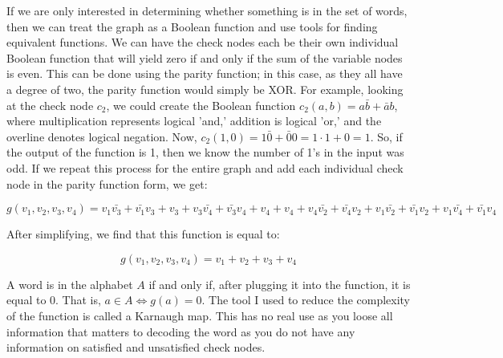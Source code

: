 \documentclass{article}
\begin{document}
If we are only interested in determining whether something is in the set of words, then we can treat the graph as a Boolean function and use tools for finding equivalent functions. We can have the check nodes each be their own individual Boolean function that will yield zero if and only if the sum of the variable nodes is even. This can be done using the parity function; in this case, as they all have a degree of two, the parity function would simply be XOR. For example, looking at the check node $c_2$, we could create the Boolean function $c_2(a, b) = a\bar{b} + \bar{a}b$, where multiplication represents logical 'and,' addition is logical 'or,' and the overline denotes logical negation. Now, $c_2(1,0) = 1\bar{0} + \bar{0}0 = 1 \cdot 1 + 0 = 1$. So, if the output of the function is 1, then we know the number of 1's in the input was odd. If we repeat this process for the entire graph and add each individual check node in the parity function form, we get:

$$g(v_1, v_2, v_3, v_4) = v_1\bar{v_3} + \bar{v_1}v_3 + v_3 + v_3\bar{v_4} + \bar{v_3}v_4 + v_4 + v_4 + v_4\bar{v_2} + \bar{v_4}v_2 + v_1\bar{v_2} + \bar{v_1}v_2 + v_1\bar{v_4} + \bar{v_1}v_4$$

After simplifying, we find that this function is equal to:

$$g(v_1, v_2, v_3, v_4) = v_1 + v_2 + v_3 + v_4$$

A word is in the alphabet $A$ if and only if, after plugging it into the function, it is equal to 0. That is, $a \in A \iff g(a) = 0$. The tool I used to reduce the complexity of the function is called a Karnaugh map. This has no real use as you loose all information that matters to decoding the word as you do not have any information on satisfied and unsatisfied check nodes.
\end{document}
